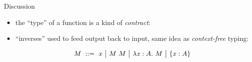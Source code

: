 \begin{frame}{Discussion}
  \begin{itemize}[<+->]
  \item the ``type'' of a function is a kind of \emph{contract}:
    \begin{figure}
      \centering
    \end{figure}
  \item ``inverses'' used to feed output back to input, same idea as
    \emph{context-free} typing:

    $$M \gequal \var x \gor \app M M \gor \tlam x A M \gor \{\var x :
    A\} $$
    \begin{mathpar}

    \end{mathpar}

  \end{itemize}
  
\end{frame}

